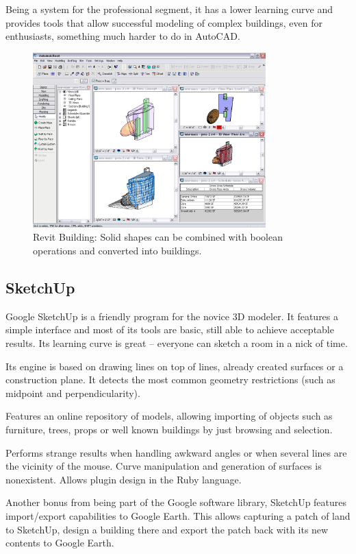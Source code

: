 Being a system for the professional segment, it has a lower learning curve and provides
tools that allow successful modeling of complex buildings, even for enthusiasts,
something much harder to do in AutoCAD.

\begin{figure}[!ht]
    \centering
    \includegraphics[width=9cm]{gfx/revit-1.png}
    \caption{Revit Building: Solid shapes can be combined with boolean operations and converted into buildings.}
    \label{FIG-REVIT}
\end{figure}

\subsection{SketchUp}
Google SketchUp \cite{SITE-SKETCHUP} is a friendly program for the novice 3D modeler.
It features a simple interface and most of its tools are basic,
still able to achieve acceptable results.
Its learning curve is great -- everyone can sketch a room in a nick of time.

Its engine is based on drawing lines on top of lines,
already created surfaces or a construction plane.
It detects the most common geometry restrictions (such as midpoint and perpendicularity).

Features an online repository of models, allowing importing of objects such as
furniture, trees, props or well known buildings by just browsing and selection.

Performs strange results when handling awkward angles or when several lines
are the vicinity of the mouse.
Curve manipulation and generation of surfaces is nonexistent.
Allows plugin design in the Ruby language.

Another bonus from being part of the Google software library, SketchUp features import/export capabilities to Google Earth\cite{SITE-EARTH}.
This allows capturing a patch of land to SketchUp, design a building there and export the patch
back with its new contents to Google Earth.

